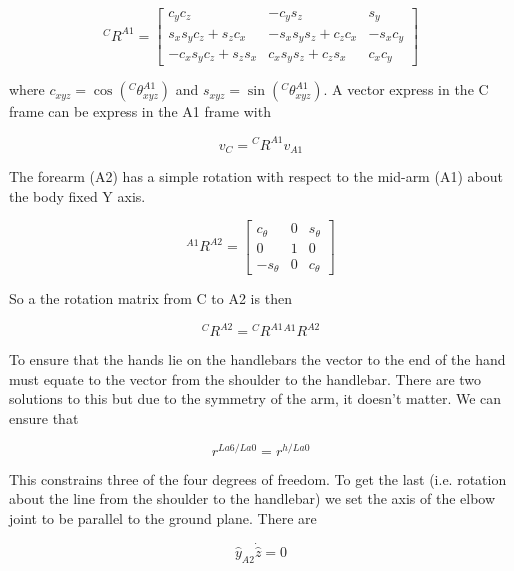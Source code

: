 \documentclass[10pt]{article}
\begin{document}
\begin{equation}
	{}^CR^{A1} =
	\begin{bmatrix}
		c_yc_z & -c_ys_z & s_y\\
		s_xs_yc_z+s_zc_x & -s_xs_ys_z+c_zc_x & -s_xc_y\\
		-c_xs_yc_z+s_zs_x & c_xs_ys_z+c_zs_x & c_xc_y
	\end{bmatrix}
\end{equation}

where \(c_{xyz}=\operatorname{cos}\left({}^C\theta^{A1}_{xyz}\right)\) and
\(s_{xyz}=\operatorname{sin}\left({}^C\theta^{A1}_{xyz}\right)\). A vector express in the C
frame can be express in the A1 frame with

\begin{equation}
	v_C={}^CR^{A1} v_{A1}
\end{equation}

The forearm (A2) has a simple rotation with respect to the mid-arm (A1) about
the body fixed Y axis.

\begin{equation}
  {}^{A1}R^{A2} =
  \begin{bmatrix}
    c_\theta & 0 & s_\theta\\
    0 & 1 & 0\\
    -s_\theta & 0 & c_\theta
  \end{bmatrix}
\end{equation}

So a the rotation matrix from C to A2 is then

\begin{equation}
	{}^CR^{A2} = {}^CR^{A1}{}^{A1}R^{A2}
\end{equation}

To ensure that the hands lie on the handlebars the vector to the end of the
hand must equate to the vector from the shoulder to the handlebar. There are
two solutions to this but due to the symmetry of the arm, it doesn't matter.
We can ensure that

\begin{equation}
	r^{La6/La0} = r^{h/La0}
\end{equation}

This constrains three of the four degrees of freedom. To get the last (i.e.
rotation about the line from the shoulder to the handlebar) we set the axis of
the elbow joint to be parallel to the ground plane. There are  

\begin{equation}
  \hat{y}_{A2}\dot\hat{z} = 0
\end{equation}
\end{document}

